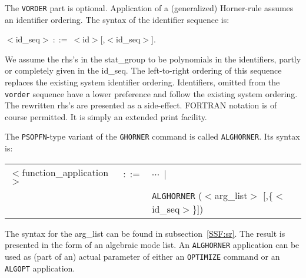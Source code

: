 The {\tt VORDER} part is optional. Application of
a (generalized) Horner-rule assumes an identifier ordering. The syntax
of the identifier sequence is:

\hspace{1cm} $<$id\_seq$>~::=~<$id$>$[,$<$id\_seq$>$].

We assume the rhs's in the stat\_group to be polynomials in
the identifiers, partly or completely given in the id\_seq. The
left-to-right ordering of this sequence replaces the existing system
identifier ordering. Identifiers, omitted from the {\tt vorder} sequence
have a lower preference and follow the existing system ordering. The
rewritten rhs's are presented as a side-effect. FORTRAN notation is of
course permitted. It is simply an extended print facility.

The {\tt PSOPFN}-type variant of the {\tt GHORNER} command is
called {\tt ALGHORNER}. Its syntax is:

\begin{center}
\begin{tabular}{lcl}
$<$function\_application$>$ & $::=$ & $\cdots~\mid$\\
 & & {\tt ALGHORNER} ($<$arg\_list$>$ [,\{$<$id\_seq$>$\}]) \\
\end{tabular}
\end{center}

The syntax for the arg\_list can be found in subsection~\ref{SSF:sr}.
The result is presented in the form of an algebraic mode list.
An {\tt ALGHORNER} application can be used as (part of an) actual parameter
of either an {\tt OPTIMIZE} command or an {\tt ALGOPT} application.

\example\label{ex:4.1.3}

